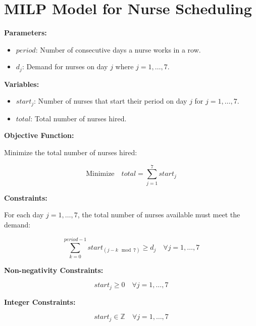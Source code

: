 \documentclass{article}
\begin{document}
\section*{MILP Model for Nurse Scheduling}

\textbf{Parameters:}

\begin{itemize}
    \item $period$: Number of consecutive days a nurse works in a row.
    \item $d_j$: Demand for nurses on day $j$ where $j = 1, \ldots, 7$.
\end{itemize}

\textbf{Variables:}

\begin{itemize}
    \item $start_j$: Number of nurses that start their period on day $j$ for $j = 1, \ldots, 7$.
    \item $total$: Total number of nurses hired.
\end{itemize}

\textbf{Objective Function:}

Minimize the total number of nurses hired:

\[
\text{Minimize} \quad total = \sum_{j=1}^{7} start_j
\]

\textbf{Constraints:}

For each day $j = 1, \ldots, 7$, the total number of nurses available must meet the demand:

\[
\sum_{k=0}^{period-1} start_{(j-k \mod 7)} \geq d_j \quad \forall j = 1, \ldots, 7
\]

\textbf{Non-negativity Constraints:}

\[
start_j \geq 0 \quad \forall j = 1, \ldots, 7
\]

\textbf{Integer Constraints:}

\[
start_j \in \mathbb{Z} \quad \forall j = 1, \ldots, 7
\]
\end{document}

